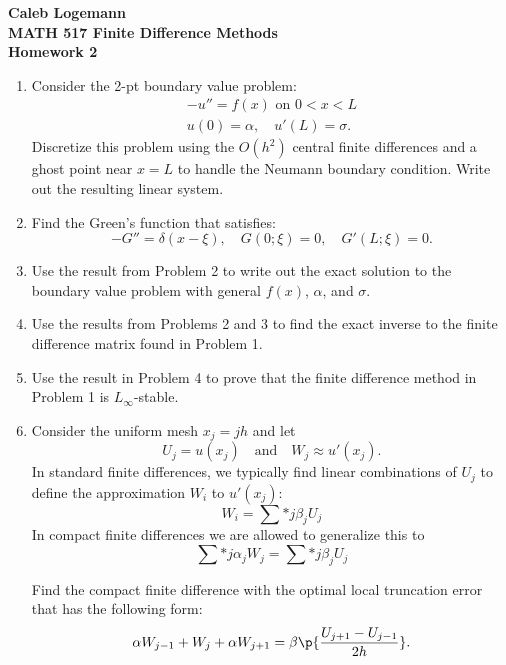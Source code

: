 \documentclass[11pt, oneside]{article}
\begin{document}
\noindent \textbf{\Large{Caleb Logemann \\
MATH 517 Finite Difference Methods \\
Homework 2
}}

%
\begin{enumerate}
    \item %
        Consider the 2-pt boundary value problem:
        \begin{align*}
            -u'' = f(x)\text{ on } 0 < x < L \\
            u(0) = \alpha, \quad u'(L) = \sigma.
        \end{align*}
        Discretize this problem using the $O(h^2)$ central finite differences
        and a ghost point near $x = L$ to handle the Neumann boundary condition.
        Write out the resulting linear system.

    \item %
        Find the Green's function that satisfies:
        \[
            -G'' = \delta(x - \xi),\quad G(0;\xi) = 0,\quad G'(L;\xi) = 0.
        \]

    \item %
        Use the result from Problem 2 to write out the exact solution to the
        boundary value problem with general $f(x)$, $\alpha$, and $\sigma$.

    \item %
        Use the results from Problems 2 and 3 to find the exact inverse to the
        finite difference matrix found in Problem 1.

    \item %
        Use the result in Problem 4 to prove that the finite difference method
        in Problem 1 is $L_{\infty}$-stable.

    \item %
        Consider the uniform mesh $x_j = jh$ and let
        \[
            U_j = u(x_j) \quad \text{and} \quad W_j \approx u'(x_j).
        \]
        In standard finite differences, we typically find linear combinations
        of $U_j$ to define the approximation $W_i$ to $u'(x_j)$:
        \[
            W_i = \sum*{j}{}{\beta_j U_j}
        \]
        In compact finite differences we are allowed to generalize this to
        \[
            \sum*{j}{}{\alpha_j W_j} = \sum*{j}{}{\beta_j U_j}
        \]

        Find the compact finite difference with the optimal local truncation
        error that has the following form:
        \[
            \alpha W_{j-1} + W_j + \alpha W_{j+1} = \beta\p{\frac{U_{j+1} - U_{j-1}}{2h}}.
        \]


\end{enumerate}
\end{document}
